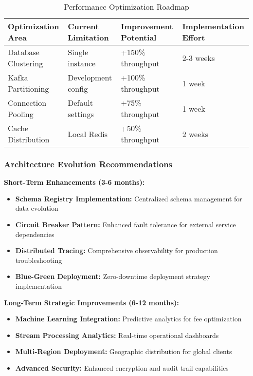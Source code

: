 \begin{table}[h]
\centering
\begin{tabular}{|l|l|l|l|}
\hline
\textbf{Optimization Area} & \textbf{Current Limitation} & \textbf{Improvement Potential} & \textbf{Implementation Effort} \\
\hline
Database Clustering & Single instance & +150\% throughput & 2-3 weeks \\
Kafka Partitioning & Development config & +100\% throughput & 1 week \\
Connection Pooling & Default settings & +75\% throughput & 1 week \\
Cache Distribution & Local Redis & +50\% throughput & 2 weeks \\
\hline
\end{tabular}
\caption{Performance Optimization Roadmap}
\end{table}

\subsubsection{Architecture Evolution Recommendations}

\textbf{Short-Term Enhancements (3-6 months):}
\begin{itemize}
    \item \textbf{Schema Registry Implementation:} Centralized schema management for data evolution
    \item \textbf{Circuit Breaker Pattern:} Enhanced fault tolerance for external service dependencies
    \item \textbf{Distributed Tracing:} Comprehensive observability for production troubleshooting
    \item \textbf{Blue-Green Deployment:} Zero-downtime deployment strategy implementation
\end{itemize}

\textbf{Long-Term Strategic Improvements (6-12 months):}
\begin{itemize}
    \item \textbf{Machine Learning Integration:} Predictive analytics for fee optimization
    \item \textbf{Stream Processing Analytics:} Real-time operational dashboards
    \item \textbf{Multi-Region Deployment:} Geographic distribution for global clients
    \item \textbf{Advanced Security:} Enhanced encryption and audit trail capabilities
\end{itemize}

